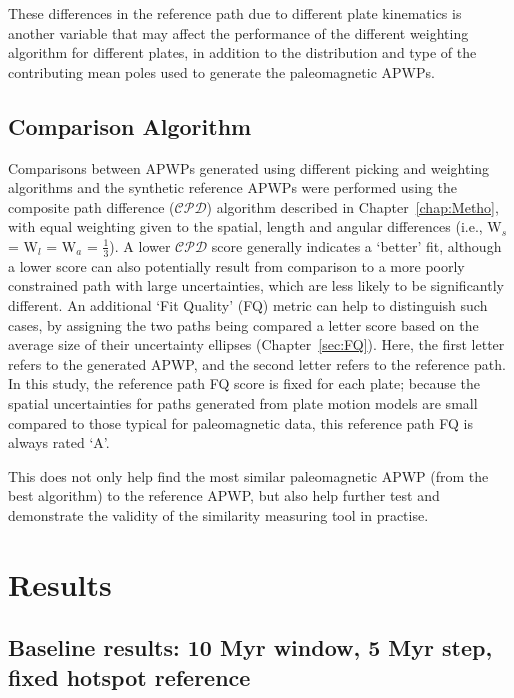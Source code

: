 These differences in the reference path due to different plate kinematics is
another variable that may affect the performance of the different weighting
algorithm for different plates, in addition to the distribution and type of the
contributing mean poles used to generate the paleomagnetic APWPs.

\subsection{Comparison Algorithm}

Comparisons between APWPs generated using different picking and weighting
algorithms and the synthetic reference APWPs were performed using the composite
path difference ($\mathcal{CPD}$) algorithm described in
Chapter~\ref{chap:Metho}, with equal weighting given to the spatial, length and
angular differences (i.e., W$_s$ = W$_l$ = W$_a$ = $\frac{1}{3}$). A lower
$\mathcal{CPD}$ score generally indicates a `better' fit, although a lower score
can also potentially result from comparison to a more poorly constrained path
with large uncertainties, which are less likely to be significantly different.
An additional `Fit Quality' (FQ) metric can help to distinguish such cases, by
assigning the two paths being compared a letter score based on the average size
of their uncertainty ellipses (Chapter~\ref{sec:FQ}). Here, the first letter
refers to the generated APWP, and the second letter refers to the reference
path. In this study, the reference path FQ score is fixed for each plate;
because the spatial uncertainties for paths generated from plate motion models
are small compared to those typical for paleomagnetic data, this reference path
FQ is always rated `A'.

This does not only help find the most similar paleomagnetic APWP (from the best
algorithm) to the reference APWP, but also help further test and demonstrate the
validity of the similarity measuring tool in practise.

\section{Results}

\subsection{Baseline results: 10 Myr window, 5 Myr step, fixed hotspot
reference}

